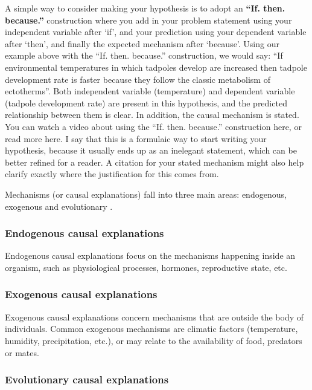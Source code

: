 \documentclass[
]{krantz}
\begin{document}
A simple way to consider making your hypothesis is to adopt an \textbf{``If. then. because.''} construction where you add in your problem statement using your independent variable after `if', and your prediction using your dependent variable after `then', and finally the expected mechanism after `because'. Using our example above with the ``If. then. because.'' construction, we would say: ``If environmental temperatures in which tadpoles develop are increased then tadpole development rate is faster because they follow the classic metabolism of ectotherms''. Both independent variable (temperature) and dependent variable (tadpole development rate) are present in this hypothesis, and the predicted relationship between them is clear. In addition, the causal mechanism is stated. You can watch a video about using the ``If. then. because.'' construction here, or read more here. I say that this is a formulaic way to start writing your hypothesis, because it usually ends up as an inelegant statement, which can be better refined for a reader. A citation for your stated mechanism might also help clarify exactly where the justification for this comes from.

Mechanisms (or causal explanations) fall into three main areas: endogenous, exogenous and evolutionary \citep{allen2017scientific}.

\hypertarget{endogenous-causal-explanations}{%
\subsubsection{Endogenous causal explanations}\label{endogenous-causal-explanations}}

Endogenous causal explanations focus on the mechanisms happening inside an organism, such as physiological processes, hormones, reproductive state, etc.

\hypertarget{exogenous-causal-explanations}{%
\subsubsection{Exogenous causal explanations}\label{exogenous-causal-explanations}}

Exogenous causal explanations concern mechanisms that are outside the body of individuals. Common exogenous mechanisms are climatic factors (temperature, humidity, precipitation, etc.), or may relate to the availability of food, predators or mates.

\hypertarget{evolutionary-causal-explanations}{%
\subsubsection{Evolutionary causal explanations}\label{evolutionary-causal-explanations}}
\end{document}
